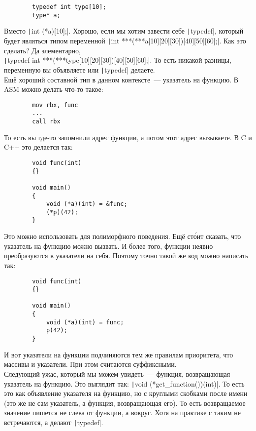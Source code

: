 \documentclass{article}
\begin{document}
    \begin{verbatim}
        typedef int type[10];
        type* a;
    \end{verbatim}
    Вместо \texttt|int (*a)[10];|. Хорошо, если мы хотим завести себе \texttt|typedef|, который будет являться типом переменной \texttt|int ***(***a[10][20][30])[40][50][60];|. Как это сделать? Да элементарно,\\
    \texttt|typedef int ***(***type[10][20][30])[40][50][60];|. То есть никакой разницы, переменную вы объявляете или \texttt|typedef| делаете.\\
    Ещё хороший составной тип в данном контексте~--- указатель на функцию. В ASM можно делать что-то такое:
    \begin{verbatim}
        mov rbx, func
        ...
        call rbx
    \end{verbatim}
    То есть вы где-то запомнили адрес функции, а потом этот адрес вызываете. В C и C++ это делается так:
    \begin{verbatim}
        void func(int)
        {}
        
        void main()
        {
            void (*a)(int) = &func;
            (*p)(42);
        }
    \end{verbatim}
    Это можно использовать для полиморфного поведения. Ещё ст\'{о}ит сказать, что указатель на функцию можно вызвать. И более того, функции неявно преобразуются в указатели на себя. Поэтому точно такой же код можно написать так:
    \begin{verbatim}
        void func(int)
        {}
        
        void main()
        {
            void (*a)(int) = func;
            p(42);
        }
    \end{verbatim}
    И вот указатели на функции подчиняются тем же правилам приоритета, что массивы и указатели. При этом считаются суффиксными.\\
    Следующий ужас, который мы можем увидеть~--- функция, возвращающая указатель на функцию. Это выглядит так: \texttt|void (*get_function())(int)|. То есть это как объявление указателя на функцию, но с круглыми скобками после имени (это же не сам указатель, а функция, возвращающая его). То есть возвращаемое значение пишется не слева от функции, а вокруг. Хотя на практике с таким не встречаются, а делают \texttt|typedef|.
\end{document}
